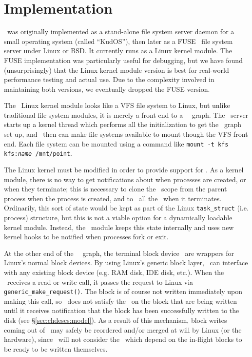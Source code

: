 \section{Implementation}
\label{sec:implementation}

\Kudos\ was originally implemented as a stand-alone file system server daemon
for a small operating system (called ``KudOS''), then later as a
FUSE~\cite{fuse} file system server under Linux or BSD. It currently runs as a
Linux kernel module. The FUSE implementation was particularly useful for
debugging, but we have found (unsurprisingly) that the Linux kernel module
version is best for real-world performance testing and actual use. Due to the
complexity involved in maintaining both versions, we eventually dropped the
FUSE version.

The \Kudos\ Linux kernel module looks like a VFS file system to Linux, but
unlike traditional file system modules,
it is merely a front end to a \Kudos\ \module\ graph. The \Kudos\
server starts up a kernel thread which performs all the initialization to get
the \module\ graph set up, and \modules\ then can make file systems available to
mount though the VFS front end. Each file system can be mounted using a
command like \mbox{\texttt{mount -t kfs kfs:\textit{name} /mnt/point}}.

The Linux kernel must be modified in order to
provide support for \opgroups.  As a kernel module, there is no way to
get notifications about when processes are created, or when they terminate; this
is necessary to clone the \opgroup\ scope 
from the parent process when the process is created, and to \abandon\ all
the \opgroups\ when it terminates. Ordinarily, this sort of state would be kept
as part of the Linux \texttt{task\_struct} (i.e. process) structure, but this is
not a viable option for a dynamically loadable kernel module. Instead, the
\Kudos\ module keeps this state internally and uses new kernel hooks
to be notified when processes fork or exit. 

At the other end of the \Kudos\ \module\ graph, the terminal block device
\modules\ are wrappers for Linux's normal block devices. By using Linux's
generic block layer, \Kudos\ can interface with any existing block device (e.g.
RAM disk, IDE disk, etc.). When the \module\ receives a read or write call, it
passes the request to Linux via \texttt{generic\_make\_request()}. The block is
of course not written immediately upon making this call, so \Kudos\ does not
satisfy the \chdescs\ on the block that are being written until it receives
notification that the block has been successfully written to the disk (see
\S\ref{sec:chdescs:model}). As a result of this mechanism, block writes coming
out of \Kudos\ may safely be reordered and/or merged at will by Linux (or the
hardware), since \Kudos\ will not consider the \chdescs\ which depend on the
in-flight blocks to be ready to be written themselves.


